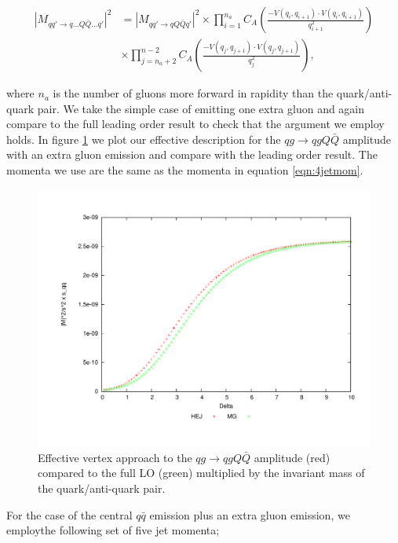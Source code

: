 \begin{equation}
\begin{split}
|M_{qq' \to q...Q\bar{Q}...q'}|^2 &= |M_{qq' \to qQ\bar{Q}q'}|^2 \times \prod_{i=1}^{n_a} C_A \left(\frac{-V(q_i,q_{i+1}) \cdot V(q_i,q_{i+1})}{q_{i+1}^2} \right) \\
&\times \prod_{j=n_a+2}^{n-2} C_A \left(\frac{-V(q_j,q_{j+1}) \cdot V(q_j,q_{j+1})}{q_j^2} \right),
\end{split}
\end{equation}

where $n_a$ is the number of gluons more forward in rapidity than the quark/anti-quark pair. We take the simple case of emitting one extra gluon and again compare to the full leading order result to check that the argument we employ holds. In figure \ref{fig:qg_qqq_emis} we plot our effective description for the $qg \to qgQ\bar{Q}$ amplitude with an extra gluon emission and compare with the leading order result. The momenta we use are the same as the momenta in equation \ref{eqn:4jetmom}. 

\begin{figure}[H]
\centering
\includegraphics[scale=0.45]{Images/qg_qgQQx_sqq.pdf}
\caption{Effective vertex approach to the $qg \to qgQ\bar{Q}$ amplitude (red) compared to the full LO (green) multiplied by the invariant mass of the quark/anti-quark pair.}
\label{fig:qg_qqq_emis}
\end{figure}

For the case of the central $q\bar{q}$ emission plus an extra gluon emission, we employthe following set of five jet momenta;


